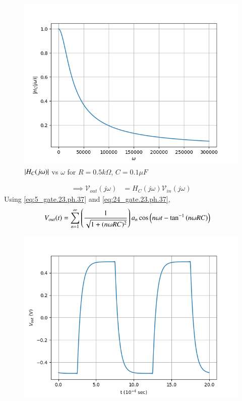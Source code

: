 \documentclass[journal,12pt,twocolumn]{IEEEtran}
\theoremstyle{remark}
\begin{document}
\begin{enumerate}
\begin{figure}[!h]
        \includegraphics[width=\columnwidth]{figs/opt_c_hf.png}
        \caption{$\left\vert H_C(j\omega)\right\vert$ vs $\omega$ for $R=0.5k\Omega$, $C=0.1\mu F$}
        \label{fig:opt_c_hf_gate.ph.23.37}
    \end{figure}
    \begin{align}
        \implies \mathcal{V}_{out}(j\omega) &= H_C(j\omega)\mathcal{V}_{in}(j\omega)
    \end{align}
     Using \eqref{eq:5_gate.23.ph.37} and  \eqref{eq:24_gate.23.ph.37},
    {\small
    \begin{align}
        V_{out}(t) &= \sum_{n=1}^{\infty}\left(\frac{1}{\sqrt{1 + (n\omega R C)^2}}\right)a_n\cos\left(n\omega t-\tan^{-1}\left(n\omega RC\right)\right)
    \end{align}
    }
    \begin{figure}[!h]
        \centering
        \includegraphics[width = \columnwidth]{figs/opt_c_res.png}

\end{figure}
\end{enumerate}
\end{document}
